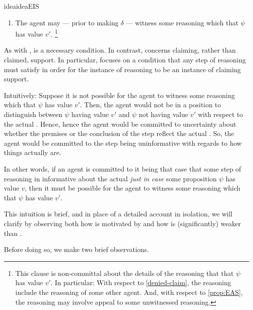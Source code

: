 \begin{note}
\begin{restatable}{idea}{ideaEIS}
\begin{itemize}[leftmargin=*]
\begin{enumerate}[resume]
      \item
        \label{idea:CS:B:prior-reasoning}
        The agent may --- prior to making \(\delta\) --- witness some reasoning which  that \(\psi\) has value \(v'\).\nolinebreak
        \footnote{
          This clause is non-committal about the details of the reasoning that  that \(\psi\) has value \(v'\).
          In particular:
          With respect to \autoref{denied-claim}, the reasoning include the reasoning of some other agent.
          And, with respect to \autoref{prop:EAS}, the reasoning may involve appeal to some unwitnessed reasoning.
        }
      \end{enumerate}
    \end{itemize}
    \vspace{-\baselineskip}
  \end{restatable}
\end{note}

\begin{note}
  As with \ideaCSA{}, \ideaCSB{} is a necessary condition.
  In contrast, \ideaCSB{} concerns claiming, rather than claimed, support.
  In particular, \ideaCSB{} focuses on a condition that any step of reasoning must satisfy in order for the instance of reasoning to be an instance of claiming support.
\end{note}

\begin{note}
  Intuitively:
  Suppose it is not possible for the agent to witness some reasoning which  that \(\psi\) has value \(v'\).
  Then, the agent would not be in a position to distinguish between \(\psi\) having value \(v'\) and \(\psi\) not having value \(v'\) with respect to the actual \world{}.
  Hence, hence the agent would be committed to uncertainty about whether the premises or the conclusion of the step reflect the actual \world{}.
  So, the agent would be committed to the step being uninformative with regards to how things actually are.

  In other words, if an agent is committed to it being that case that some step of reasoning in informative about the actual \world{} \emph{just in case} some proposition \(\psi\) has value \(v\), then it must be possible for the agent to witness some reasoning which  that \(\psi\) has value \(v'\).
\end{note}

\begin{note}
  This intuition is brief, and in place of a detailed account \ideaCSB{} in isolation, we will clarify \ideaCSB{} by observing both how \ideaCSB{} is motivated by \ideaCSA{} and how \ideaCSB{} is (significantly) weaker than \ideaCSA{}.

  Before doing so, we make two brief observations.
\end{note}


